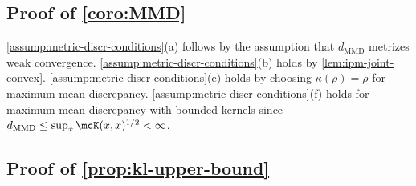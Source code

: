 \subsection{Proof of \cref{coro:MMD}}
 \cref{assump:metric-discr-conditions}(a) follows by the assumption that $d_{\mathrm{MMD}}$ metrizes weak convergence.
 \cref{assump:metric-discr-conditions}(b) holds by \cref{lem:ipm-joint-convex}.
 \cref{assump:metric-discr-conditions}(e) holds by choosing $\kappa(\rho) =\rho$ for maximum mean discrepancy. \cref{assump:metric-discr-conditions}(f) holds for maximum mean discrepancy with bounded kernels since $d_{\mathrm{MMD}} \le \sup_{x} \mcK(x,x)^{1/2} < \infty$.


\subsection{Proof of \cref{prop:kl-upper-bound}}

